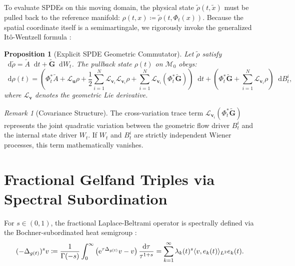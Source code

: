\documentclass[11pt,a4paper]{article}
\newcommand*{\diff}{\mathop{}\!\mathrm{d}}
\newcommand*{\ee}{\mathrm{e}}
\newcommand*{\M}{\mathcal{M}}
\newcommand*{\Lie}{\mathcal{L}}
\DeclarePairedDelimiter{\inner}{\langle}{\rangle}
\theoremstyle{plain}
\newtheorem{proposition}[theorem]{Proposition}
\theoremstyle{definition}
\theoremstyle{remark}
\newtheorem{remark}[theorem]{Remark}
\begin{document}
To evaluate SPDEs on this moving domain, the physical state $\tilde{\rho}(t, \tilde{x})$ must be pulled back to the reference manifold: $\rho(t, x) \coloneqq \tilde{\rho}(t, \Phi_t(x))$. Because the spatial coordinate itself is a semimartingale, we rigorously invoke the generalized It\^{o}-Wentzell formula \cite{Rozovskii1990}:

\begin{proposition}[Explicit SPDE Geometric Commutator]
Let $\tilde{\rho}$ satisfy $\diff \tilde{\rho} = \tilde{A} \diff t + \tilde{\mathbf{G}} \diff W_t$. The pullback state $\rho(t)$ on $\M_0$ obeys:
\begin{equation}
    \diff \rho(t) = \left( \Phi_t^* \tilde{A} + \Lie_{\mathbf{u}} \rho + \frac{1}{2} \sum_{i=1}^N \Lie_{\mathbf{v}_i} \Lie_{\mathbf{v}_i} \rho + \sum_{i=1}^N \Lie_{\mathbf{v}_i} (\Phi_t^* \tilde{\mathbf{G}}) \right) \diff t + \left( \Phi_t^* \tilde{\mathbf{G}} + \sum_{i=1}^N \Lie_{\mathbf{v}_i} \rho \right) \diff B_t^i,
\end{equation}
where $\Lie_{\mathbf{v}}$ denotes the geometric Lie derivative. 
\end{proposition}
\begin{remark}[Covariance Structure]
The cross-variation trace term $\Lie_{\mathbf{v}_i} (\Phi_t^* \tilde{\mathbf{G}})$ represents the joint quadratic variation between the geometric flow driver $B_t^i$ and the internal state driver $W_t$. If $W_t$ and $B_t^i$ are strictly independent Wiener processes, this term mathematically vanishes.
\end{remark}

\section{Fractional Gelfand Triples via Spectral Subordination}
For $s \in (0,1)$, the fractional Laplace-Beltrami operator is spectrally defined via the Bochner-subordinated heat semigroup \cite{Stinga2010}:
\begin{equation}
    (-\Delta_{g(t)})^s v \coloneqq \frac{1}{\Gamma(-s)} \int_0^\infty \left( \ee^{\tau \Delta_{g(t)}} v - v \right) \frac{\diff \tau}{\tau^{1+s}} = \sum_{k=1}^\infty \lambda_k(t)^s \inner{v, e_k(t)}_{L^2} e_k(t).
\end{equation}
\end{document}
